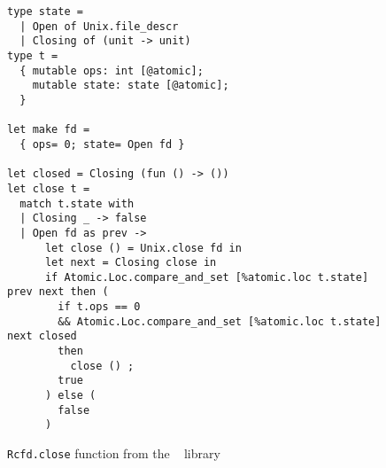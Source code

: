 \begin{figure}[tp]
\begin{verbatim}
type state =
  | Open of Unix.file_descr
  | Closing of (unit -> unit)
type t =
  { mutable ops: int [@atomic];
    mutable state: state [@atomic];
  }

let make fd =
  { ops= 0; state= Open fd }

let closed = Closing (fun () -> ())
let close t =
  match t.state with
  | Closing _ -> false
  | Open fd as prev ->
      let close () = Unix.close fd in
      let next = Closing close in
      if Atomic.Loc.compare_and_set [%atomic.loc t.state] prev next then (
        if t.ops == 0
        && Atomic.Loc.compare_and_set [%atomic.loc t.state] next closed
        then
          close () ;
        true
      ) else (
        false
      )
\end{verbatim}
\caption{\texttt{Rcfd.close} function from the \Eio~\cite{eio} library}
\label{fig:rcfd}
\end{figure}